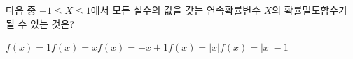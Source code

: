 다음 중 $-1\le X\le 1$에서 모든 실수의 값을 갖는 연속확률변수 $X$의 확률밀도함수가 될 수 있는 것은?
\begin{choicesii}{$f(x)=1$}{$f(x)=x$}{$f(x)=-x+1$}{$f(x)=|x|$}{$f(x)=|x|-1$}\end{choicesii}
